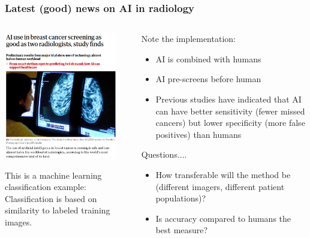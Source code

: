 \begin{frame}
\frametitle{Latest (good) news on AI in radiology}
\small
\begin{columns}[T]
    \begin{column}[T]{0.5\textwidth}
    \begin{center}
       \vspace{-5mm}
        \includegraphics[width=0.9\textwidth]{./misc_images/radiology_1}
        
    \end{center}
    \footnotesize{This is a machine learning classification example: Classification is based on similarity to labeled training images.}
        
    \end{column}


    \begin{column}{0.49\textwidth}
    
    Note the implementation:
    \begin{itemize}
    \item AI is combined with humans 
    \item AI pre-screens before human
    \item Previous studies have indicated that AI can have better sensitivity (fewer missed cancers) but lower specificity (more false positives) than humans
    \end{itemize}

    Questions....
    \begin{itemize}
    \item How transferable will the method be (different imagers, different patient populations)?
    \item Is accuracy compared to humans the best measure?
    \end{itemize}
    \end{column}
\end{columns}

\end{frame}